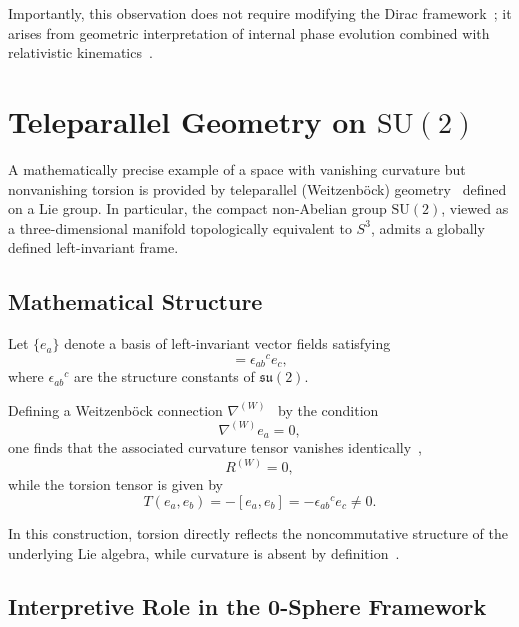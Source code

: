 \documentclass[12pt,letterpaper]{article}
\begin{document}
Importantly, this observation does not require modifying the Dirac framework~\cite{Dirac1928}; it arises from geometric interpretation of internal phase evolution combined with relativistic kinematics~\cite{hanamura17765409}.


\section{Teleparallel Geometry on $\mathrm{SU}(2)$}

\justifying
A mathematically precise example of a space with vanishing curvature but nonvanishing torsion is provided by teleparallel (Weitzenb\"{o}ck) geometry~\cite{Weitzenbock1923,Aldrovandi2013} defined on a Lie group. In particular, the compact non-Abelian group $\mathrm{SU}(2)$, viewed as a three-dimensional manifold topologically equivalent to $S^{3}$, admits a globally defined left-invariant frame.

\subsection{Mathematical Structure}

Let $\{e_{a}\}$ denote a basis of left-invariant vector fields satisfying
\begin{equation}
[e_{a}, e_{b}] = \epsilon_{ab}{}^{c} e_{c},
\end{equation}
where $\epsilon_{ab}{}^{c}$ are the structure constants of $\mathfrak{su}(2)$.

Defining a Weitzenb\"{o}ck connection $\nabla^{(W)}$~\cite{Weitzenbock1923} by the condition
\begin{equation}
\nabla^{(W)} e_{a} = 0,
\end{equation}
one finds that the associated curvature tensor vanishes identically~\cite{Aldrovandi2013},
\begin{equation}
R^{(W)} = 0,
\end{equation}
while the torsion tensor is given by
\begin{equation}
T(e_{a}, e_{b}) = -[e_{a}, e_{b}] = -\epsilon_{ab}{}^{c} e_{c} \neq 0.
\end{equation}

In this construction, torsion directly reflects the noncommutative structure of the underlying Lie algebra, while curvature is absent by definition~\cite{Weitzenbock1923,Aldrovandi2013}.

\subsection{Interpretive Role in the 0-Sphere Framework}
\end{document}
